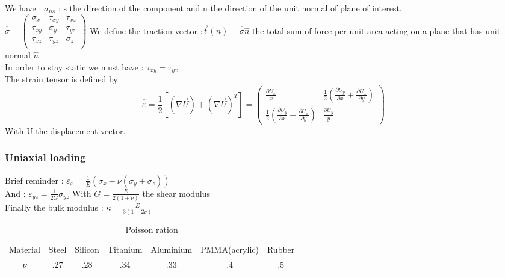 \documentclass[../main.tex]{subfiles}
\begin{document}
We have : $\sigma_{ns}$ : s the direction of the component and n the direction of the unit normal of plane of interest.\\

$\overline{\overline{\sigma}} = \begin{pmatrix}
    \sigma_x & \tau_{xy} & \tau_{xz}\\
    \tau_{xy} & \sigma_y & \tau_{yz}\\
    \tau_{xz} & \tau_{yz} & \sigma_z\\
\end{pmatrix}$
We define the traction vector :$\vec{t}(n) = \overline{\overline{\sigma}}\hat{n}$ the total sum of force per unit area acting on a plane that has unit normal $\hat{n}$\\

In order to stay static we must have : $\tau_{xy} = \tau_{yx}$\\

The strain tensor is defined by : 
\begin{equation}
    \overline{\overline{\varepsilon}} = \frac{1}{2} [(\nabla \vec{U}) + (\nabla \vec{U})^T] = \begin{pmatrix}
        \frac{\partial U_x}{x} & \frac{1}{2}(\frac{\partial U_y}{\partial x} + \frac{\partial U_x}{\partial y})\\
        \frac{1}{2}(\frac{\partial U_y}{\partial x} + \frac{\partial U_x}{\partial y}) & \frac{\partial U_y}{y}
    \end{pmatrix}
\end{equation}
With U the displacement vector.\\

\subsubsection{Uniaxial loading}
Brief reminder : $\varepsilon_x = \frac{1}{E} (\sigma_x - \nu (\sigma_y + \sigma_z))$\\
And : $\varepsilon_{yz} = \frac{1}{2G} \sigma_{yz}$ With $G = \frac{E}{2(1+\nu)}$ the shear modulus\\
Finally the bulk modulus : $\kappa = \frac{E}{3(1-2\nu)}$\\

\begin{table}[hbt!]
    \centering
    \begin{tabular}{c|c|c|c|c|c|c}
        Material & Steel & Silicon & Titanium & Aluminium & PMMA(acrylic) & Rubber \\
        $\nu$ & .27&.28&.34&.33&.4&.5\\
    \end{tabular}
    \caption{Poisson ration}
    
\end{table}
\end{document}
